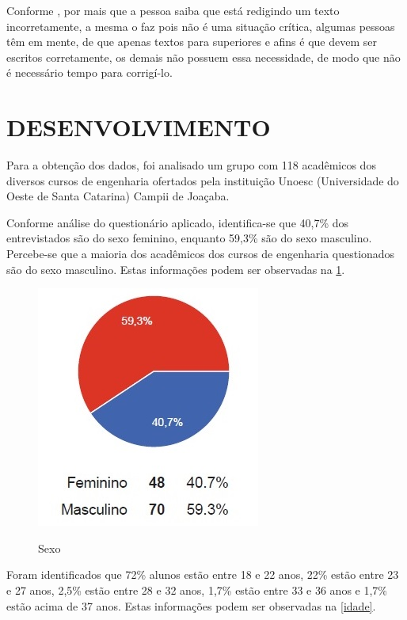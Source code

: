 \documentclass[
	article,			%
	11pt,				%
	oneside,			%
	a4paper,			%
	english,			%
	brazil,				%
	sumario=tradicional
	]{abntex2}
\begin{document}
Conforme , por mais que a pessoa saiba que está redigindo um texto incorretamente, a mesma o faz pois não é uma situação crítica, algumas pessoas têm em mente, de que apenas textos para superiores e afins é que devem ser escritos corretamente, os demais não possuem essa necessidade, de modo que não é necessário tempo para corrigí-lo.  


\section{DESENVOLVIMENTO}
Para a obtenção dos dados, foi analisado um grupo com 118 acadêmicos dos diversos cursos de engenharia ofertados pela instituição Unoesc (Universidade do Oeste de Santa Catarina) Campii de Joaçaba.

Conforme análise do questionário aplicado, identifica-se que 40,7\% dos entrevistados são do sexo feminino, enquanto 59,3\% são do sexo masculino.
Percebe-se que a maioria dos acadêmicos dos cursos de engenharia questionados são do sexo masculino. Estas informações podem ser observadas na \figurename{ \ref{sexo}}.

\begin{figure}[h]  
	\begin{center} 
		\begin{center}
			\changecaptionwidth 
			\captionwidth{13.5cm} %
			\caption{\label{sexo} Sexo}
		 	{\includegraphics[scale=0.8]{imagens/sexo}}
		\end{center}
	\end{center}
\end{figure}
\FloatBarrier


Foram identificados que 72\% alunos estão entre 18 e 22 anos, 22\% estão entre 23 e 27 anos, 2,5\% estão entre 28 e 32 anos, 1,7\% estão entre 33 e 36 anos e 1,7\% estão acima de 37 anos. Estas informações podem ser observadas na \figurename{ \ref{idade}}.
\end{document}
